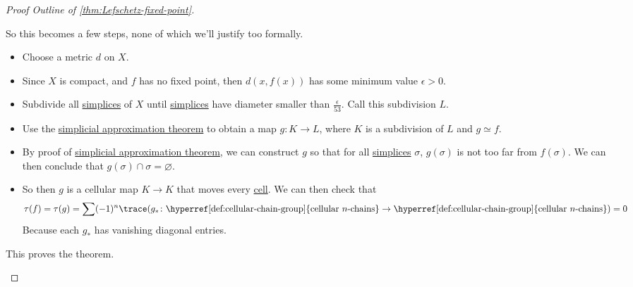 \begin{proof}[Proof Outline of \autoref{thm:Lefschetz-fixed-point}]
\begin{enumerate}
		      So this becomes a few steps, none of which we'll justify too formally.
		      \begin{itemize}
			      \item Choose a metric \(d\) on \(X\).
			      \item Since \(X\) is compact, and \(f\) has no fixed point, then \(d(x, f(x))\) has some minimum value \(\epsilon > 0\).
			      \item Subdivide all \hyperref[def:standard-simplex]{simplices} of \(X\) until \hyperref[def:standard-simplex]{simplices} have diameter
			            smaller than \(\frac{\epsilon }{53}\). Call this subdivision \(L\).
			      \item Use the \hyperref[thm:simplicial-approximation-theorem]{simplicial approximation theorem} to obtain a map \(g \colon K \to L\),
			            where \(K\) is a subdivision of \(L\) and \(g \simeq f\).
			      \item By proof of \hyperref[thm:simplicial-approximation-theorem]{simplicial approximation theorem}, we can construct \(g\) so that for
			            all \hyperref[def:standard-simplex]{simplices} \(\sigma\), \(g(\sigma)\) is not too far from \(f(\sigma)\).
			            We can then conclude that \(g(\sigma) \cap \sigma = \varnothing \).
			      \item So then \(g\) is a cellular map \(K \to K\) that moves every \hyperref[def:cell]{cell}. We can then check that
			            \[
				            \tau(f) = \tau(g) = \sum (-1)^n \trace(g_\ast \colon \text{\hyperref[def:cellular-chain-group]{cellular \(n\)-chains}} \to \text{\hyperref[def:cellular-chain-group]{cellular \(n\)-chains}}) = 0
			            \]
			            Because each \(g_\ast\) has vanishing diagonal entries.
		      \end{itemize}
		      This proves the theorem.
	\end{enumerate}
\end{proof}